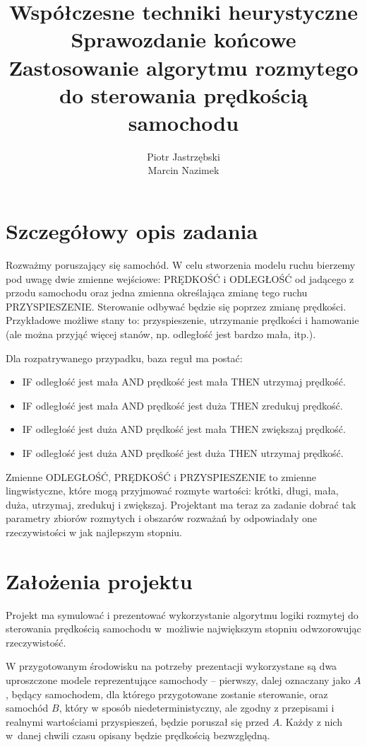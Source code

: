\documentclass[11pt,a4paper]{article}
\title{Współczesne techniki heurystyczne\\ Sprawozdanie końcowe\\ \large Zastosowanie algorytmu rozmytego do sterowania prędkością samochodu}
\author{Piotr Jastrzębski\\ Marcin Nazimek}
\date{}
\begin{document}
\maketitle

\section{Szczegółowy opis zadania}\label{opis}
Rozważmy poruszający się samochód. W celu stworzenia modelu ruchu bierzemy pod uwagę dwie zmienne wejściowe: PRĘDKOŚĆ i ODLEGŁOŚĆ od jadącego z przodu samochodu oraz jedna zmienna określająca zmianę tego ruchu PRZYSPIESZENIE. Sterowanie odbywać będzie się poprzez zmianę prędkości. Przykładowe możliwe stany to: przyspieszenie, utrzymanie prędkości i hamowanie (ale można przyjąć więcej stanów, np. odległość jest bardzo mała, itp.).

Dla rozpatrywanego przypadku, baza reguł ma postać:
\begin{itemize}
\item IF odległość jest mała AND prędkość jest mała THEN utrzymaj prędkość.
\item IF odległość jest mała AND prędkość jest duża THEN zredukuj prędkość.
\item IF odległość jest duża AND prędkość jest mała THEN zwiększaj prędkość.
\item IF odległość jest duża AND prędkość jest duża THEN utrzymaj prędkość.
\end{itemize}
Zmienne ODLEGŁOŚĆ, PRĘDKOŚĆ i PRZYSPIESZENIE to zmienne lingwistyczne, które mogą przyjmować rozmyte wartości: krótki, długi, mała, duża, utrzymaj, zredukuj i zwiększaj. Projektant ma teraz za zadanie dobrać tak parametry zbiorów rozmytych i obszarów rozważań by odpowiadały one rzeczywistości w jak najlepszym stopniu.

\section{Założenia projektu}\label{zalozenia}
Projekt ma symulować i prezentować wykorzystanie algorytmu logiki rozmytej do sterowania prędkością samochodu w~możliwie największym stopniu odwzorowując rzeczywistość.

W przygotowanym środowisku na potrzeby prezentacji wykorzystane są dwa uproszczone modele reprezentujące samochody -- pierwszy, dalej oznaczany jako $A$, będący samochodem, dla którego przygotowane zostanie sterowanie, oraz samochód $B$, który w sposób niedeterministyczny, ale zgodny z przepisami i realnymi wartościami przyspieszeń, będzie poruszał się przed $A$. Każdy z nich w~danej chwili czasu opisany będzie prędkością bezwzględną. 
\end{document}
